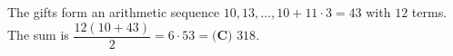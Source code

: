 The gifts form an arithmetic sequence $10,13,\dots,10+11\cdot3=43$ with $12$ terms. The sum is $\dfrac{12(10+43)}{2}=6\cdot53=\boxed{\textbf{(C) }318}$.
